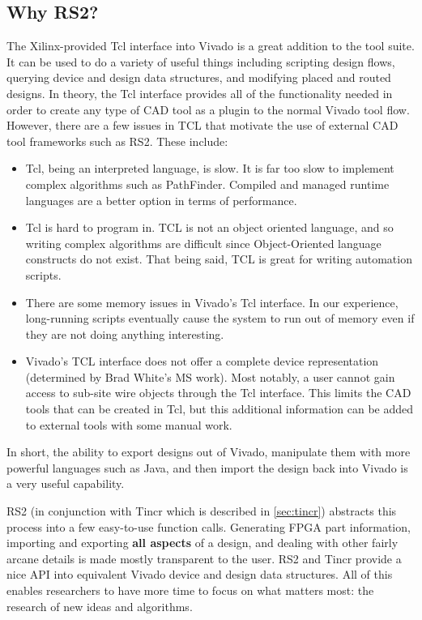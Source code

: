 \documentclass[10pt]{article}
\newcommand{\pgm}[1]{{\textbf{#1}}}
\begin{document}
\subsection{Why RS2?}
The Xilinx-provided Tcl interface into Vivado is a great addition to the tool
suite. It can be used to do a variety of useful things including scripting
design flows, querying device and design data structures, and  modifying placed
and routed designs. In theory, the Tcl interface provides all of the
functionality needed in order to create any type of CAD tool as a plugin to the
normal Vivado tool flow. However, there are a few issues in TCL that motivate
the use of external CAD tool frameworks such as RS2. These include:
\begin{itemize}
  \item Tcl, being an interpreted language, is slow. It is far too slow to
  implement complex algorithms such as PathFinder. Compiled and
  managed runtime languages are a better option in terms of performance.
  \item Tcl is hard to program in. TCL is not an object oriented language, and
  so writing complex algorithms are difficult since Object-Oriented language
  constructs do not exist. That being said, TCL is great for writing automation
  scripts.
  \item There are some memory issues in Vivado's Tcl interface. In our
  experience, long-running scripts eventually cause the system to run out of
  memory even if they are not doing anything interesting.
  \item Vivado's TCL interface does not offer a complete device representation
  (determined by Brad White's MS work). Most notably, a user cannot gain
  access to sub-site wire objects through the Tcl interface. This limits the CAD
  tools that can be created in Tcl, but this additional information can be added
  to external tools with some manual work.
\end{itemize}

\noindent
In short, the ability to export designs out of Vivado, manipulate them with more
powerful languages such as Java, and then import the design back into Vivado
is a very useful capability.

RS2 (in conjunction with Tincr which is described in \autoref{sec:tincr})
abstracts this process into a few easy-to-use function calls. Generating FPGA
part information, importing and exporting \pgm{all aspects} of a design, and
dealing with other fairly arcane details is made mostly transparent to the
user. RS2 and Tincr provide a nice API into equivalent Vivado device and design
data structures. All of this enables researchers to have more time to focus on what matters
most: the research of new ideas and algorithms.
\end{document}
